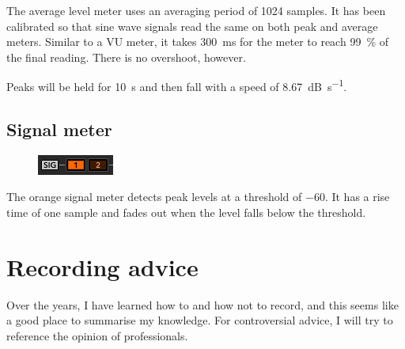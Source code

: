 The average level meter uses an averaging period of \num{1024}
samples.  It has been calibrated so that sine wave signals read the
same on both peak and average meters.  Similar to a VU meter, it takes
\SI{300}{\milli\second} for the meter to reach \SI{99}{\percent} of
the final reading.  There is no overshoot, however.

Peaks will be held for \SI{10}{\second} and then fall with a speed of
\SI{8.67}{\dB\per\second}.

\section{Signal meter}

\begin{figure}
\includegraphics[scale=\screenshotscale,clip]{include/images/level_meter_signal.png}
\end{figure}

The orange signal meter detects peak levels at a threshold of
\SI{-60}{\dBFS}.  It has a rise time of one sample and fades out when
the level falls below the threshold.

\chapter{Recording advice}
\label{chap:recording_advice}

Over the years, I have learned how to and how not to record, and this
seems like a good place to summarise my knowledge.  For controversial
advice, I will try to reference the opinion of professionals.

